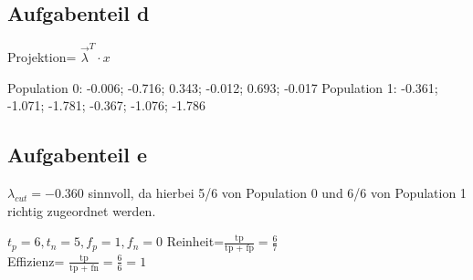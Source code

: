 \documentclass[11pt,a4paper]{article}
\begin{document}
\subsection*{Aufgabenteil d}

Projektion= $\vec{\lambda}^T \cdot x$

Population 0: -0.006; -0.716; 0.343; -0.012; 0.693; -0.017
Population 1: -0.361; -1.071; -1.781; -0.367; -1.076; -1.786

\subsection*{Aufgabenteil e}
$\lambda_{cut}= -0.360$ sinnvoll, da hierbei 5/6 von Population 0 und 6/6 von Population 1 richtig zugeordnet werden.

\rightarrow
$t_p= 6, t_n=5,f_p= 1, f_n=0
$
\rightarrow Reinheit=$\frac{\text{tp}}{\text{tp + fp}}= \frac{6}{7}$ \\
Effizienz= $\frac{\text{tp}}{\text{tp + fn}}= \frac{6}{6}=1$
\end{document}
